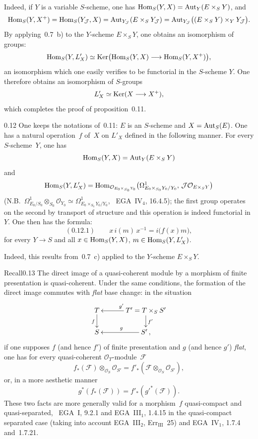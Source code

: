 Indeed, if \(Y\) is a variable \(S\)-scheme, one has
\(\operatorname{Hom}_{S}(Y,X)=\operatorname{Aut}_{Y}(E\times_{S}Y)\), and
\[
\operatorname{Hom}_{S}(Y,X^{+})
=
\operatorname{Hom}_{S}(Y_{\mathcal{J}},X)
=
\operatorname{Aut}_{Y_{\mathcal{J}}}(E\times_{S}Y_{\mathcal{J}})
=
\operatorname{Aut}_{Y_{\mathcal{J}}}\bigl((E\times_{S}Y)\times_{Y}Y_{\mathcal{J}}\bigr).
\]
By applying~0.7~b) to the \(Y\)-scheme \(E\times_{S}Y\), one obtains an
isomorphism of groups:
\[
\operatorname{Hom}_{S}(Y,L'_{X})
\simeq
\operatorname{Ker}\bigl(\operatorname{Hom}_{S}(Y,X)\longrightarrow\operatorname{Hom}_{S}(Y,X^{+})\bigr),
\]
an isomorphism which one easily verifies to be functorial in the \(S\)-scheme
\(Y\). One therefore obtains an isomorphism of \(S\)-groups
\[
L'_{X}\simeq\operatorname{Ker}(X\longrightarrow X^{+}),
\]
which completes the proof of proposition~0.11.

\begin{corollary}{0.12}
\label{III.0.12}
{\renewcommand{\thefootnote}{(29)}}
One keeps the notations of~0.11: \(E\) is an \(S\)-scheme and
\(X=\operatorname{Aut}_{S}(E)\). One has a natural operation~\(f\) of~\(X\) on \(L'_{X}\)
defined in the following manner. For every \(S\)-scheme~\(Y\), one has
\[
\operatorname{Hom}_{S}(Y,X)=\operatorname{Aut}_{Y}(E\times_{S}Y)
\]
and
\[
\operatorname{Hom}_{S}(Y,L'_{X})
=
\operatorname{Hom}_{\mathcal{O}_{E_{0}\times_{S_{0}}Y_{0}}}
  \bigl(\Omega^{1}_{E_{0}\times_{S_{0}}Y_{0}/Y_{0}},\,
  \mathcal{J}\mathcal{O}_{E\times_{S}Y}\bigr)
\]
(N.B.\ \(\Omega^{1}_{E_{0}/S_{0}}\otimes_{S_{0}}\mathcal{O}_{Y_{0}}
\simeq\Omega^{1}_{E_{0}\times_{S_{0}}Y_{0}/Y_{0}}\),
\cf\ EGA~IV\(_4\), 16.4.5); the first group operates on the second by
transport of structure and this operation is indeed functorial in~\(Y\).
One then has the formula:
\begin{equation*}
(0.12.1)\qquad
x\,i(m)\,x^{-1}=i\bigl(f(x)m\bigr),
\end{equation*}
for every \(Y\to S\) and all \(x\in\operatorname{Hom}_{S}(Y,X)\),
\(m\in\operatorname{Hom}_{S}(Y,L'_{X})\).
\end{corollary}

Indeed, this results from~0.7~c) applied to the \(Y\)-scheme
\(E\times_{S}Y\).

\begin{enoncerm}{Recall}{0.13}
\label{III.0.13}
The direct image of a quasi-coherent module by a morphism of finite
presentation is quasi-coherent. Under the same conditions, the formation of
the direct image commutes with \emph{flat} base change: in the situation
\[
\xymatrix@C=3.2em@R=1.6em{
T \ar[d]_{f}
  & T'=T\times_{S}S' \ar[l]_{g'} \ar[d]^{f'} \\
S
  & S' \ar[l]_{g}\,,
}
\]
if one supposes \(f\) (and hence \(f'\)) of finite presentation and \(g\) (and
hence \(g'\)) \emph{flat}, one has for every quasi-coherent
\(\mathcal{O}_{T}\)-module~\(\mathcal{F}\)
\[
f_{*}(\mathcal{F})\otimes_{\mathcal{O}_{S}}\mathcal{O}_{S'}
=
f'_{*}(\mathcal{F}\otimes_{\mathcal{O}_{S}}\mathcal{O}_{S'}),
\]
or, in a more aesthetic manner
\[
g^{*}(f_{*}(\mathcal{F}))=f'_{*}(g'^{*}(\mathcal{F})).
\]
These two facts are more generally valid for a morphism~\(f\) quasi-compact
and quasi-separated, \cf\ EGA~I, 9.2.1 and EGA~III\(_1\), 1.4.15 in the
quasi-compact separated case (taking into account EGA~III\(_2\),
Err\(_{\mathrm{III}}\)~25) and EGA~IV\(_1\), 1.7.4 and~1.7.21.
\end{enoncerm}

